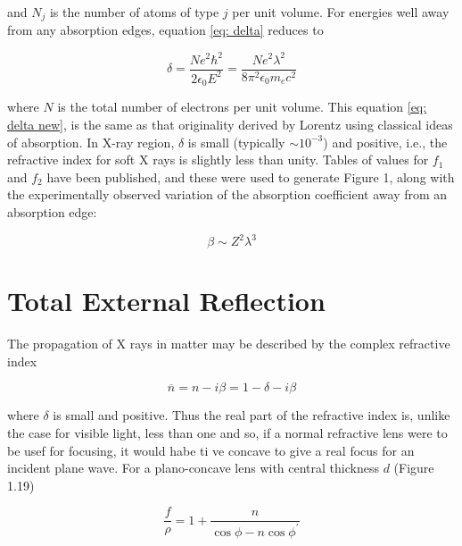 \begin{flushleft}
and $N_j $ is the number of atoms of type $j $ per unit volume. For energies well away from any absorption edges, equation \ref{eq: delta} reduces to 
\end{flushleft}

\begin{equation}
\delta = \frac{N e^2 \hbar^2}{2 \epsilon_0  E^2} = \frac{N e^2 \lambda^2}{8 \pi^2 \epsilon_0 m_e c^2}
\label{eq: delta new}
\end{equation}

\begin{flushleft}
where $N $ is the total number of electrons per unit volume. This equation \ref{eq: delta new}, is the same as that originality derived by Lorentz using classical ideas of absorption. In X-ray region, $\delta $ is small (typically $\sim 10^{-3} $) and positive, i.e., the refractive index for soft X rays is slightly less than unity. Tables of values for $f_1 $ and $f_2 $ have been published, and these were used to generate Figure 1, along with the experimentally observed variation of the absorption coefficient away from an absorption edge:
\end{flushleft}

\begin{equation}
\beta \sim Z^2 \lambda^3
\label{eq: new beta}
\end{equation}


\section{Total External Reflection}

The propagation of X rays in matter may be described by the complex refractive index

\begin{equation}
\overline{n} = n - i \beta = 1 - \delta - i \beta
\label{eq: n_bar new}
\end{equation}

\begin{flushleft}
where $\delta $ is small and positive. Thus the real part of the refractive index is, unlike the case for visible light, less than one and so, if a normal refractive lens were to be usef for focusing, it would habe ti ve concave to give a real focus for an incident plane wave. For a plano-concave lens with central thickness $d $ (Figure 1.19)
\end{flushleft}

\begin{equation}
	\frac{f}{\rho} = 1 + \frac{n}{\cos \phi - n \cos \phi^{'}}
	\label{eq: f/rho}
\end{equation}

